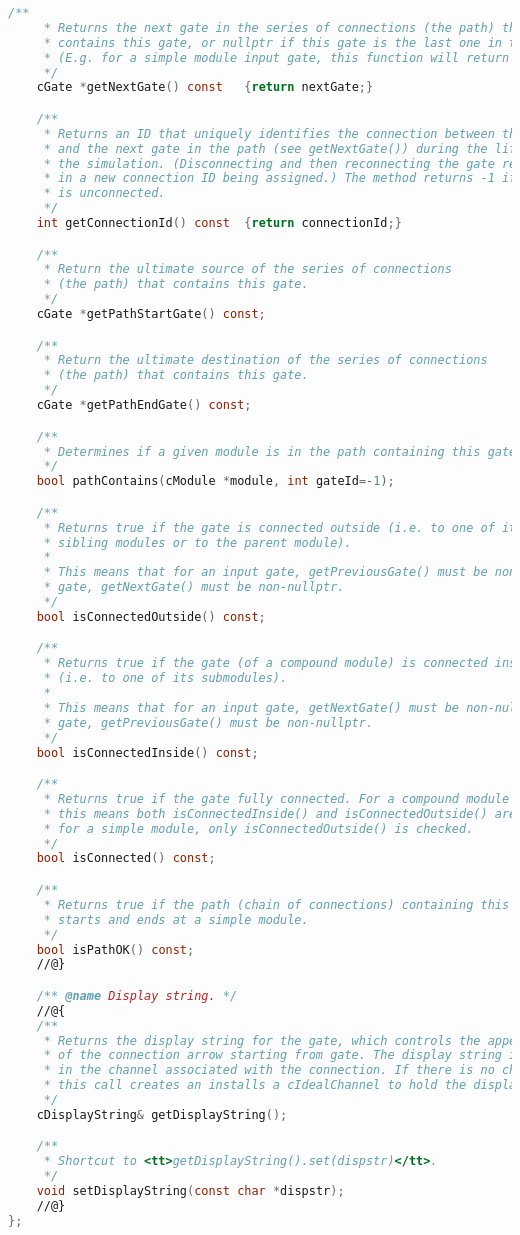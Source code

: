 \begin{lstlisting}[language=c]
    /**
     * Returns the next gate in the series of connections (the path) that
     * contains this gate, or nullptr if this gate is the last one in the path.
     * (E.g. for a simple module input gate, this function will return nullptr.)
     */
    cGate *getNextGate() const   {return nextGate;}

    /**
     * Returns an ID that uniquely identifies the connection between this gate
     * and the next gate in the path (see getNextGate()) during the lifetime of
     * the simulation. (Disconnecting and then reconnecting the gate results
     * in a new connection ID being assigned.) The method returns -1 if the gate
     * is unconnected.
     */
    int getConnectionId() const  {return connectionId;}

    /**
     * Return the ultimate source of the series of connections
     * (the path) that contains this gate.
     */
    cGate *getPathStartGate() const;

    /**
     * Return the ultimate destination of the series of connections
     * (the path) that contains this gate.
     */
    cGate *getPathEndGate() const;

    /**
     * Determines if a given module is in the path containing this gate.
     */
    bool pathContains(cModule *module, int gateId=-1);

    /**
     * Returns true if the gate is connected outside (i.e. to one of its
     * sibling modules or to the parent module).
     *
     * This means that for an input gate, getPreviousGate() must be non-nullptr; for an output
     * gate, getNextGate() must be non-nullptr.
     */
    bool isConnectedOutside() const;

    /**
     * Returns true if the gate (of a compound module) is connected inside
     * (i.e. to one of its submodules).
     *
     * This means that for an input gate, getNextGate() must be non-nullptr; for an output
     * gate, getPreviousGate() must be non-nullptr.
     */
    bool isConnectedInside() const;

    /**
     * Returns true if the gate fully connected. For a compound module gate
     * this means both isConnectedInside() and isConnectedOutside() are true;
     * for a simple module, only isConnectedOutside() is checked.
     */
    bool isConnected() const;

    /**
     * Returns true if the path (chain of connections) containing this gate
     * starts and ends at a simple module.
     */
    bool isPathOK() const;
    //@}

    /** @name Display string. */
    //@{
    /**
     * Returns the display string for the gate, which controls the appearance
     * of the connection arrow starting from gate. The display string is stored
     * in the channel associated with the connection. If there is no channel,
     * this call creates an installs a cIdealChannel to hold the display string.
     */
    cDisplayString& getDisplayString();

    /**
     * Shortcut to <tt>getDisplayString().set(dispstr)</tt>.
     */
    void setDisplayString(const char *dispstr);
    //@}
};

\end{lstlisting}

